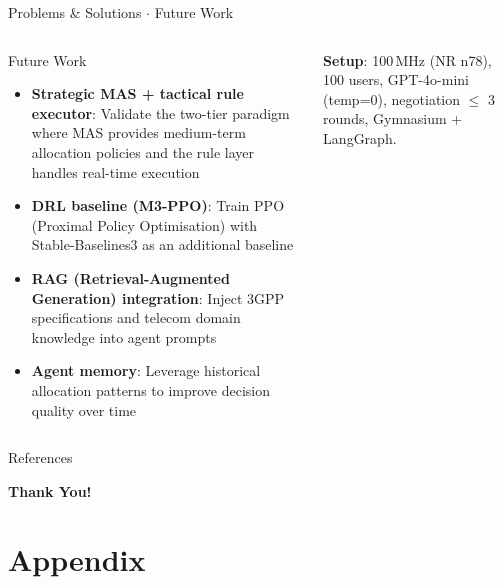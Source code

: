 \documentclass[9pt,aspectratio=169]{beamer}
\begin{document}
\begin{frame}{Problems \& Solutions $\cdot$ Future Work}
\begin{columns}[T]
\begin{block}{\scriptsize Future Work}
\scriptsize
\begin{itemize}
\item \textbf{Strategic MAS + tactical rule executor}: Validate the two-tier paradigm where MAS provides medium-term allocation policies and the rule layer handles real-time execution
\item \textbf{DRL baseline (M3-PPO)}: Train PPO (Proximal Policy Optimisation) with Stable-Baselines3 as an additional baseline
\item \textbf{RAG (Retrieval-Augmented Generation) integration}: Inject 3GPP specifications and telecom domain knowledge into agent prompts
\item \textbf{Agent memory}: Leverage historical allocation patterns to improve decision quality over time
\end{itemize}
\end{block}

\vspace{4pt}
{\tiny\textbf{Setup}: 100\,MHz (NR n78), 100 users, GPT-4o-mini (temp=0), negotiation $\leq$ 3 rounds, Gymnasium + LangGraph.}

\end{columns}
\end{frame}


\begin{frame}{References}
\tiny
\printbibliography[heading=none]
\end{frame}

\begin{frame}[plain]
\centering
\vspace{1cm}
{\Huge \textbf{Thank You!}}
\vspace{1em}
\end{frame}


\appendix
\section*{Appendix}
\end{document}
